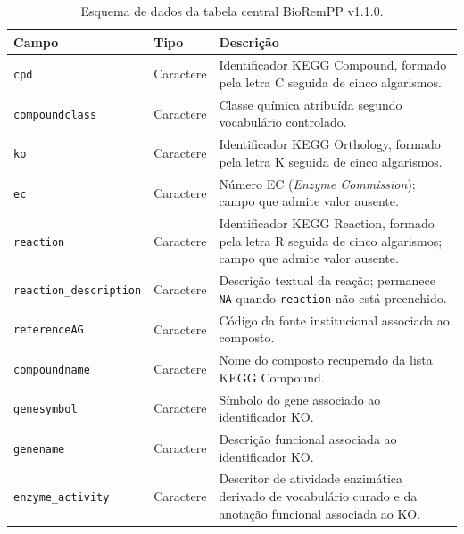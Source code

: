 \begin{table}[htbp]
\centering
\caption{Esquema de dados da tabela central BioRemPP v1.1.0.}
\label{tab:c1-schema}
\small
\begin{tabularx}{\textwidth}{@{}llX@{}}
\toprule
\textbf{Campo} & \textbf{Tipo} & \textbf{Descrição} \\
\midrule

\texttt{cpd}
& Caractere
& Identificador KEGG Compound, formado pela letra C seguida de cinco
algarismos. \\

\texttt{compoundclass}
& Caractere
& Classe química atribuída segundo vocabulário controlado. \\

\texttt{ko}
& Caractere
& Identificador KEGG Orthology, formado pela letra K seguida de cinco
algarismos. \\

\texttt{ec}
& Caractere
& Número EC (\textit{Enzyme Commission}); campo que admite valor ausente. \\

\texttt{reaction}
& Caractere
& Identificador KEGG Reaction, formado pela letra R seguida de cinco
algarismos; campo que admite valor ausente. \\

\texttt{reaction\_description}
& Caractere
& Descrição textual da reação; permanece \texttt{NA} quando
\texttt{reaction} não está preenchido. \\

\texttt{referenceAG}
& Caractere
& Código da fonte institucional associada ao composto. \\

\texttt{compoundname}
& Caractere
& Nome do composto recuperado da lista KEGG Compound. \\

\texttt{genesymbol}
& Caractere
& Símbolo do gene associado ao identificador KO. \\

\texttt{genename}
& Caractere
& Descrição funcional associada ao identificador KO. \\

\texttt{enzyme\_activity}
& Caractere
& Descritor de atividade enzimática derivado de vocabulário curado e da
anotação funcional associada ao KO. \\

\bottomrule
\end{tabularx}
\end{table}

